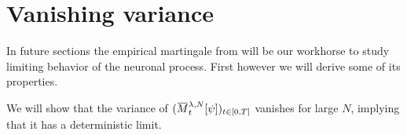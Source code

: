 \section{Vanishing variance}    %

In future sections the empirical martingale from  will be our workhorse to study limiting behavior of the neuronal process.  %
First however we will derive some of its properties.

We will show that the variance of \((\ol{M}_t^{\lambda,N}[\psi])_{t\in[0,T]}\) vanishes for large \(N\), implying that it has a deterministic limit.    %

